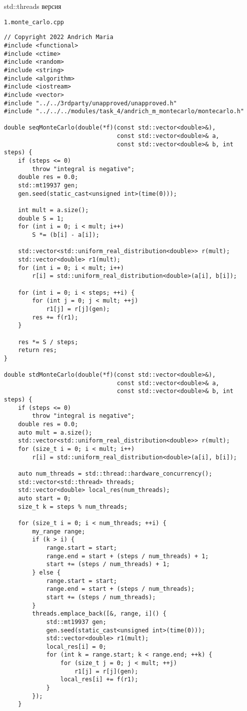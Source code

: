 \documentclass{report}
\begin{document}
\par std::threads версия
\par \verb|1.monte_carlo.cpp|
\begin{lstlisting}
// Copyright 2022 Andrich Maria
#include <functional>
#include <ctime>
#include <random>
#include <string>
#include <algorithm>
#include <iostream>
#include <vector>
#include "../../3rdparty/unapproved/unapproved.h"
#include "../../../modules/task_4/andrich_m_montecarlo/montecarlo.h"

double seqMonteCarlo(double(*f)(const std::vector<double>&),
                                const std::vector<double>& a,
                                const std::vector<double>& b, int steps) {
    if (steps <= 0)
        throw "integral is negative";
    double res = 0.0;
    std::mt19937 gen;
    gen.seed(static_cast<unsigned int>(time(0)));

    int mult = a.size();
    double S = 1;
    for (int i = 0; i < mult; i++)
        S *= (b[i] - a[i]);

    std::vector<std::uniform_real_distribution<double>> r(mult);
    std::vector<double> r1(mult);
    for (int i = 0; i < mult; i++)
        r[i] = std::uniform_real_distribution<double>(a[i], b[i]);

    for (int i = 0; i < steps; ++i) {
        for (int j = 0; j < mult; ++j)
            r1[j] = r[j](gen);
        res += f(r1);
    }

    res *= S / steps;
    return res;
}

double stdMonteCarlo(double(*f)(const std::vector<double>&),
                                const std::vector<double>& a,
                                const std::vector<double>& b, int steps) {
    if (steps <= 0)
        throw "integral is negative";
    double res = 0.0;
    auto mult = a.size();
    std::vector<std::uniform_real_distribution<double>> r(mult);
    for (size_t i = 0; i < mult; i++)
        r[i] = std::uniform_real_distribution<double>(a[i], b[i]);

    auto num_threads = std::thread::hardware_concurrency();
    std::vector<std::thread> threads;
    std::vector<double> local_res(num_threads);
    auto start = 0;
    size_t k = steps % num_threads;

    for (size_t i = 0; i < num_threads; ++i) {
        my_range range;
        if (k > i) {
            range.start = start;
            range.end = start + (steps / num_threads) + 1;
            start += (steps / num_threads) + 1;
        } else {
            range.start = start;
            range.end = start + (steps / num_threads);
            start += (steps / num_threads);
        }
        threads.emplace_back([&, range, i]() {
            std::mt19937 gen;
            gen.seed(static_cast<unsigned int>(time(0)));
            std::vector<double> r1(mult);
            local_res[i] = 0;
            for (int k = range.start; k < range.end; ++k) {
                for (size_t j = 0; j < mult; ++j)
                    r1[j] = r[j](gen);
                local_res[i] += f(r1);
            }
        });
    }


\end{lstlisting}
\end{document}
